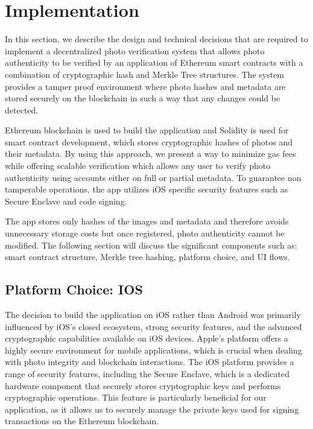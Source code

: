 \chapter{Implementation}

In this section, we describe the design and technical decisions that are required to implement a decentralized photo verification system that allows photo authenticity to be verified by an application of Ethereum smart contracts with a combination of cryptographic hash and Merkle Tree structures. The system provides a tamper proof environment where photo hashes and metadata are stored securely on the blockchain in such a way that any changes could be detected.

Ethereum blockchain is used to build the application and Solidity is used for smart contract development, which stores cryptographic hashes of photos and their metadata. By using this approach, we present a way to minimize gas fees while offering scalable verification which allows any user to verify photo authenticity using accounts either on full or partial metadata. To guarantee non tamperable operations, the app utilizes iOS specific security features such as Secure Enclave and code signing.

The app stores only hashes of the images and metadata and therefore avoids unnecessary storage costs but once registered, photo authenticity cannot be modified. The following section will discuss the significant components such as: smart contract structure, Merkle tree hashing, platform choice, and UI flows.
\break
\section{Platform Choice: IOS}
The decision to build the application on iOS rather than Android was primarily influenced by iOS's closed ecosystem, strong security features, and the advanced cryptographic capabilities available on iOS devices. Apple’s platform offers a highly secure environment for mobile applications, which is crucial when dealing with photo integrity and blockchain interactions.
The iOS platform provides a range of security features, including the Secure Enclave, which is a dedicated hardware component that securely stores cryptographic keys and performs cryptographic operations. This feature is particularly beneficial for our application, as it allows us to securely manage the private keys used for signing transactions on the Ethereum blockchain.

